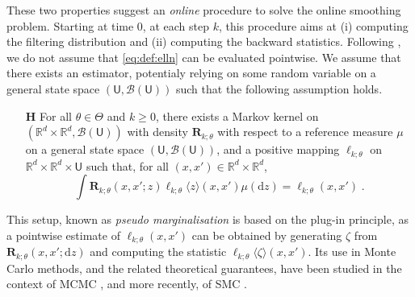 \documentclass{article}
\def\Xset{\mathbb{R}^d}
\newcommand{\md}[1]{g_{#1}}
\newcommand{\parvec}{\theta}
\newcommand{\parspace}{\Theta}
\newcommand{\hd}[1]{q_{#1}}
\newcommand{\rmd}{\ensuremath{\mathrm{d}}}
\newcommand{\eqsp}{\;}
\newcounter{hypH}
\newenvironment{hypH}{\refstepcounter{hypH}\begin{itemize}
\item[{\bf H\arabic{hypH}}]}{\end{itemize}}
\newcommand{\marginalset}{\mathsf{U}}
\newcommand{\kernelmarg}{\mathbf{R}}
\newcommand{\qg}[1]{\ell_{#1}}
\newcommand{\hatqg}[1]{\mathsf{\ell}_{#1}}
\begin{document}
These two properties suggest an \textit{online} procedure to solve the online smoothing problem. Starting at time 0, at each step $k$, this procedure aims at (i) computing the filtering distribution and (ii) computing the backward statistics. %
Following \cite{fearnhead2008particle, olsson2011particle, gloaguen2018online, gloaguen2021pseudo}, we do not assume that  \eqref{eq:def:elln} can be evaluated pointwise.
We assume that there exists an estimator, potentialy relying on some random variable on a general state space $(\marginalset,\mathcal{B}(\marginalset))$ such that the following assumption holds.
\begin{hypH} 
\label{assum:unbiased}
For all $\parvec \in\parspace$ and $k\geqslant 0$, there exists a Markov kernel on $(\Xset\times\Xset,\mathcal{B}(\marginalset))$ with density $\kernelmarg_{k;\parvec}$ with respect to a reference measure $\mu$ on a general state space $(\marginalset,\mathcal{B}(\marginalset))$,  and a positive mapping $\hatqg{k;\parvec}$ on $\Xset\times\Xset\times\marginalset$ such that, for all $(x,x')\in\Xset \times \Xset$,
\begin{equation*}
\int \kernelmarg_{k;\parvec}(x,x';z)\hatqg{k;\parvec}\langle z\rangle(x,x')\mu(\rmd z) =  \qg{k;\parvec}(x,x')\eqsp.
\end{equation*}
\end{hypH}
This setup, known as \textit{pseudo marginalisation} is based on the plug-in principle, as a pointwise estimate of $\qg{k;\parvec}(x,x')$ can be obtained by generating $\zeta$ from $\kernelmarg_{k;\parvec}(x,x';\rmd z)$ and computing the statistic $\hatqg{k;\parvec}\langle \zeta\rangle(x,x')$. 
Its use in Monte Carlo methods, and the related theoretical guarantees, have been studied in the context of MCMC \cite{andrieu2009pseudo}, and more recently, of SMC \cite{gloaguen2021pseudo}.
\end{document}
